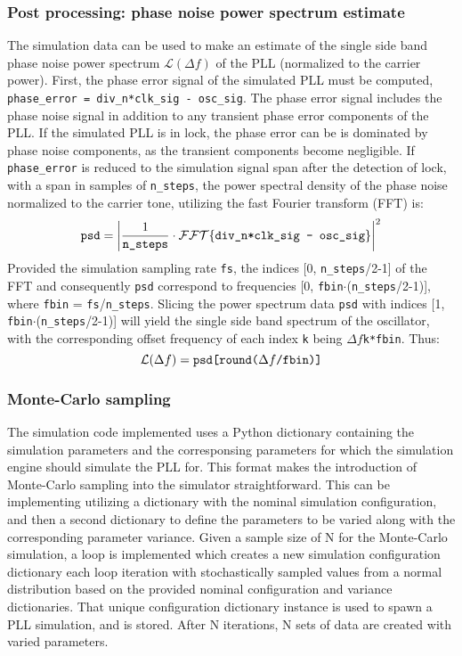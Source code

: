 \subsubsection{Post processing: phase noise power spectrum estimate}
The simulation data can be used to make an estimate of the single side band phase noise power spectrum $\mathcal{L}(\Delta f)$ of the PLL (normalized to the carrier power). First, the phase error signal of the simulated PLL must be computed, \texttt{phase\_error = div\_n*clk\_sig - osc\_sig}. The phase error signal includes the phase noise signal in addition to any transient phase error components of the PLL. If the simulated PLL is in lock, the phase error can be is dominated by phase noise components, as the transient components become negligible. If \texttt{phase\_error} is reduced to the simulation signal span after the detection of lock, with a span in samples of \texttt{n\_steps}, the power spectral density of the phase noise normalized to the carrier tone, utilizing the fast Fourier transform (FFT) is:
\begin{equation}
	\text{\texttt{psd}} = \left|\frac{1}{\text{\texttt{n\_steps}}}\cdot\mathcal{FFT}\{\text{\texttt{div\_n*clk\_sig - osc\_sig}}\}\right|^2
\end{equation}
Provided the simulation sampling rate \texttt{fs}, the indices [0, \texttt{n\_steps}/2-1] of the FFT and consequently \texttt{psd} correspond to frequencies [0, \texttt{fbin}$\cdot$(\texttt{n\_steps}/2-1)], where \texttt{fbin} = \texttt{fs}/\texttt{n\_steps}. Slicing the power spectrum data \texttt{psd} with indices [1, \texttt{fbin}$\cdot$(\texttt{n\_steps}/2-1)] will yield the single side band spectrum of the oscillator, with the corresponding offset frequency of each index \texttt{k} being $\Delta f$\texttt{k*fbin}. Thus:
\begin{equation}
	\mathcal{L}(\Delta f) = \text{\texttt{psd[round(}}\Delta f\text{\texttt{/fbin)]}}
\end{equation}

\subsubsection{Monte-Carlo sampling}
The simulation code implemented uses a Python dictionary containing the simulation parameters and the corresponsing parameters for which the simulation engine should simulate the PLL for. This format makes the introduction of Monte-Carlo sampling into the simulator straightforward. This can be implementing utilizing a dictionary with the nominal simulation configuration, and then a second dictionary to define the parameters to be varied along with the corresponding parameter variance. Given a sample size of N for the Monte-Carlo simulation, a loop is implemented which creates a new simulation configuration dictionary each loop iteration with stochastically sampled values from a normal distribution based on the provided nominal configuration and variance dictionaries. That unique configuration dictionary instance is used to spawn a PLL simulation, and is stored. After N iterations, N sets of data are created with varied parameters.

